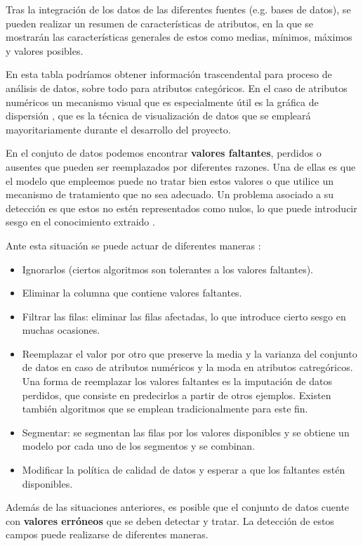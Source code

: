Tras la integración de los datos de las diferentes fuentes (e.g. bases de datos), se pueden realizar un resumen de características de atributos, en la que
se mostrarán las características generales de estos como medias, mínimos, máximos y valores posibles. 

En esta tabla podríamos obtener información trascendental para proceso de análisis de datos, sobre todo para atributos categóricos.
En el caso de atributos numéricos un mecanismo visual que es especialmente útil es la gráfica de dispersión \cite{book:hernandez2004}, que es la técnica de visualización
de datos que se empleará mayoritariamente durante el desarrollo del proyecto.

En el conjuto de datos podemos encontrar \textbf{valores faltantes}, perdidos o ausentes que pueden ser reemplazados por diferentes razones. Una de ellas es que
el modelo que empleemos puede no tratar bien estos valores o que utilice un mecanismo de tratamiento que no sea adecuado.
Un problema asociado a su detección es que estos no estén representados como nulos, lo que puede introducir sesgo en el conocimiento
extraido \cite{book:hernandez2004}.

Ante esta situación se puede actuar de diferentes maneras \cite{book:hernandez2004}:
\begin{itemize}
    \item Ignorarlos (ciertos algoritmos son tolerantes a los valores faltantes).
    \item Eliminar la columna que contiene valores faltantes.
    \item Filtrar las filas: eliminar las filas afectadas, lo que introduce cierto sesgo en muchas ocasiones.
    \item Reemplazar el valor por otro que preserve la media y la varianza del conjunto de datos en caso de atributos numéricos y la moda en atributos
        catregóricos.
        Una forma de reemplazar los valores faltantes es la imputación de datos perdidos, que consiste en predecirlos a partir de otros ejemplos. Existen también
        algoritmos que se emplean tradicionalmente para este fin.
    \item Segmentar: se segmentan las filas por los valores disponibles y se obtiene un modelo por cada uno de los segmentos y se combinan.
    \item Modificar la política de calidad de datos y esperar a que los faltantes estén disponibles.
\end{itemize}

Además de las situaciones anteriores, es posible que el conjunto de datos cuente con \textbf{valores erróneos} que 
se deben detectar y tratar.
La detección de estos campos puede realizarse de diferentes maneras.

